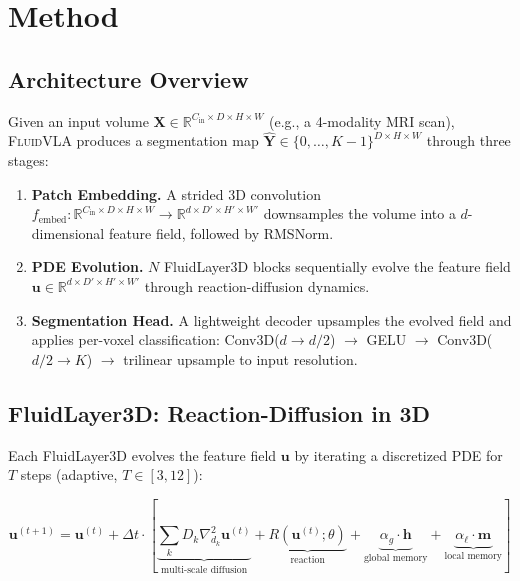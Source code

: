\documentclass{article}
\newcommand{\R}{\mathbb{R}}
\newcommand{\lapl}{\nabla^2}
\newcommand{\fluidvla}{\textsc{FluidVLA}}
\begin{document}
\section{Method}
\label{sec:method}

\subsection{Architecture Overview}

Given an input volume $\mathbf{X} \in \R^{C_{\text{in}} \times D \times H \times W}$ (e.g., a 4-modality MRI scan), \fluidvla{} produces a segmentation map $\hat{\mathbf{Y}} \in \{0, \ldots, K-1\}^{D \times H \times W}$ through three stages:

\begin{enumerate}
    \item \textbf{Patch Embedding.} A strided 3D convolution $f_{\text{embed}}: \R^{C_{\text{in}} \times D \times H \times W} \to \R^{d \times D' \times H' \times W'}$ downsamples the volume into a $d$-dimensional feature field, followed by RMSNorm.
    \item \textbf{PDE Evolution.} $N$ FluidLayer3D blocks sequentially evolve the feature field $\mathbf{u} \in \R^{d \times D' \times H' \times W'}$ through reaction-diffusion dynamics.
    \item \textbf{Segmentation Head.} A lightweight decoder upsamples the evolved field and applies per-voxel classification: Conv3D($d \to d/2$) $\to$ GELU $\to$ Conv3D($d/2 \to K$) $\to$ trilinear upsample to input resolution.
\end{enumerate}

\subsection{FluidLayer3D: Reaction-Diffusion in 3D}

Each FluidLayer3D evolves the feature field $\mathbf{u}$ by iterating a discretized PDE for $T$ steps (adaptive, $T \in [3, 12]$):

\begin{equation}
\label{eq:pde}
\mathbf{u}^{(t+1)} = \mathbf{u}^{(t)} + \Delta t \cdot \left[\underbrace{\sum_{k} D_k \lapl_{d_k} \mathbf{u}^{(t)}}_{\text{multi-scale diffusion}} + \underbrace{R(\mathbf{u}^{(t)}; \theta)}_{\text{reaction}} + \underbrace{\alpha_g \cdot \mathbf{h}}_{\text{global memory}} + \underbrace{\alpha_\ell \cdot \mathbf{m}}_{\text{local memory}}\right]
\end{equation}
\end{document}

